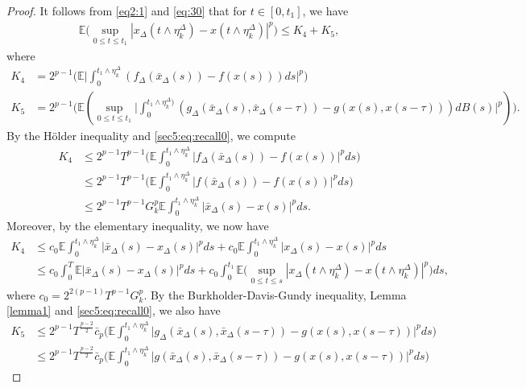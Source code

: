 \documentclass[11pt]{article}
\begin{document}
\begin{proof}
It follows from \eqref{eq2:1} and \eqref{eq:30} that for $t\in [0,t_1]$, we have
\begin{align*}
\mathbb{E}\Big(\sup_{0\leq t \leq t_1}|x_{\Delta}(t\wedge\eta^{\Delta}_k)-x(t\wedge\eta^{\Delta}_k)|^p\Big)\le K_4+K_5,
\end{align*}
 where
\begin{align*} 
K_4&=2^{p-1}\Big( \mathbb{E}\Big|\int_{0}^{t_1\wedge \eta^{\Delta}_k}(f_{\Delta}(\bar{x}_{\Delta}(s))-f(x(s)))ds\Big|^p\Big)\\
K_5&=2^{p-1}\Big(\mathbb{E}(\sup_{0\leq t \leq t_1}\Big|\int_{0}^{t_1\wedge \eta^{\Delta}_k)}(g_{\Delta}(\bar{x}_{\Delta}(s),\bar{x}_{\Delta}(s-\tau))-g(x(s),x(s-\tau)))dB(s)\Big|^p)\Big).
\end{align*}
By the H\"older inequality and \eqref{sec5:eq:recall0}, we compute
\begin{align*} 
K_4&\le 2^{p-1}T^{p-1}\Big( \mathbb{E}\int_{0}^{t_1\wedge \eta^{\Delta}_k}|f_{\Delta}(\bar{x}_{\Delta}(s))-f(x(s))|^pds\Big)\\
&\le 2^{p-1}T^{p-1}\Big(\mathbb{E}\int_{0}^{t_1\wedge \eta^{\Delta}_k}|f(\bar{x}_{\Delta}(s))-f(x(s))|^pds\Big)\\
&\le 2^{p-1}T^{p-1}G_k^p\mathbb{E}\int_{0}^{t_1\wedge \eta^{\Delta}_k}|\bar{x}_{\Delta}(s)-x(s)|^pds.
\end{align*}
Moreover, by the elementary inequality, we now have 
\begin{align}\label{grown0}
K_4&\le c_0\mathbb{E}\int_{0}^{t_1\wedge \eta^{\Delta}_k}|\bar{x}_{\Delta}(s)-x_{\Delta}(s)|^pds+c_0\mathbb{E}\int_{0}^{t_1\wedge \eta^{\Delta}_k}|x_{\Delta}(s)-x(s)|^pds\nonumber\\
&\le c_0\int_{0}^{T}\mathbb{E}|\bar{x}_{\Delta}(s)-x_{\Delta}(s)|^pds+c_0\int_{0}^{t_1}\mathbb{E}\Big(\sup_{0\le t\le s}|x_{\Delta}(t\wedge \eta^{\Delta}_k)-x(t\wedge \eta^{\Delta}_k)|^p\Big)ds,
\end{align}
where $c_0=2^{2(p-1)}T^{p-1}G_k^p$. By the Burkholder-Davis-Gundy inequality, Lemma \ref{lemma1} and \eqref{sec5:eq:recall0}, we also have 
\begin{align*}
K_5&\le 2^{p-1}T^{\frac{p-2}{2}} \bar{c}_p\Big(\mathbb{E}\int_{0}^{t_1\wedge \eta^{\Delta}_k}\vert g_{\Delta}(\bar{x}_{\Delta}(s),\bar{x}_{\Delta}(s-\tau))-g(x(s),x(s-\tau))\vert^pds \Big)\\
&\le 2^{p-1}T^{\frac{p-2}{2}} \bar{c}_p\Big(\mathbb{E}\int_{0}^{t_1\wedge \eta^{\Delta}_k}\vert g(\bar{x}_{\Delta}(s),\bar{x}_{\Delta}(s-\tau))-g(x(s),x(s-\tau))\vert^pds \Big)

\end{align*}
\end{proof}
\end{document}

